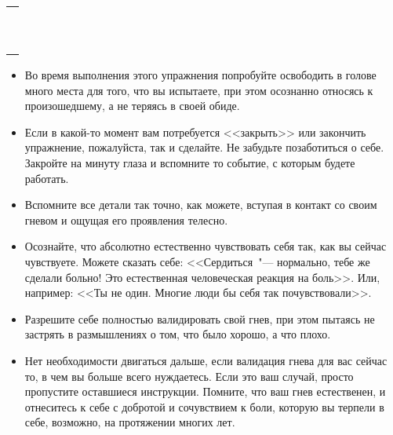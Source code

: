 \setlength{\extrarowheight}{2mm}
\begin{tabularx}{0.96\textwidth}{X}
	\\
	\arrayrulecolor{gray}\hline\\
	\hline\\
	\hline\\
	\hline\\
	\hline\\
	\hline\\	
	\hline\\
	\hline\\
	\hline\\
	\hline\\
	\hline\\
\end{tabularx}
\setlength{\extrarowheight}{0mm}
\begin{itemize}
	\item Во время выполнения этого упражнения попробуйте освободить в голове много места для того, что вы испытаете, при этом осознанно относясь к произошедшему, а не теряясь в своей обиде.
	
	\item Если в какой-то момент вам потребуется <<закрыть>> или закончить упражнение, пожалуйста, так и сделайте. Не забудьте позаботиться о себе. Закройте на минуту глаза и вспомните то событие, с которым будете работать.
	
	\item Вспомните все детали так точно, как можете, вступая в контакт со своим гневом и ощущая его проявления телесно.
	
	\item Осознайте, что абсолютно естественно чувствовать себя так, как вы сейчас чувствуете. Можете сказать себе: <<Сердиться~"--- нормально, тебе же сделали больно! Это естественная человеческая реакция на боль>>. Или, например: <<Ты не один. Многие люди бы себя так почувствовали>>.
	
	\item Разрешите себе полностью валидировать свой гнев, при этом пытаясь не застрять в размышлениях о том, что было хорошо, а что плохо.
	
	\item Нет необходимости двигаться дальше, если валидация гнева для вас сейчас то, в чем вы больше всего нуждаетесь. Если это ваш случай, просто пропустите оставшиеся инструкции. Помните, что ваш гнев естественен, и отнеситесь к себе с добротой и сочувствием к боли, которую вы терпели в себе, возможно, на протяжении многих лет.
\end{itemize}
 
